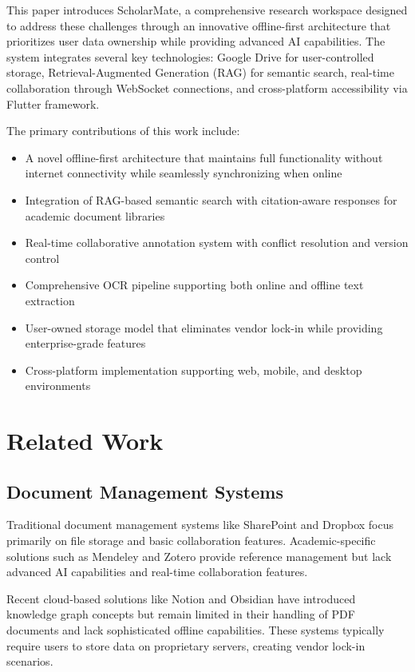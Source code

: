 \documentclass[conference]{IEEEtran}
\begin{document}
This paper introduces ScholarMate, a comprehensive research workspace designed to address these challenges through an innovative offline-first architecture that prioritizes user data ownership while providing advanced AI capabilities. The system integrates several key technologies: Google Drive for user-controlled storage, Retrieval-Augmented Generation (RAG) for semantic search, real-time collaboration through WebSocket connections, and cross-platform accessibility via Flutter framework.

The primary contributions of this work include:

\begin{itemize}
\item A novel offline-first architecture that maintains full functionality without internet connectivity while seamlessly synchronizing when online
\item Integration of RAG-based semantic search with citation-aware responses for academic document libraries
\item Real-time collaborative annotation system with conflict resolution and version control
\item Comprehensive OCR pipeline supporting both online and offline text extraction
\item User-owned storage model that eliminates vendor lock-in while providing enterprise-grade features
\item Cross-platform implementation supporting web, mobile, and desktop environments
\end{itemize}

\section{Related Work}

\subsection{Document Management Systems}

Traditional document management systems like SharePoint \cite{sharepoint} and Dropbox \cite{dropbox} focus primarily on file storage and basic collaboration features. Academic-specific solutions such as Mendeley \cite{mendeley} and Zotero \cite{zotero} provide reference management but lack advanced AI capabilities and real-time collaboration features.

Recent cloud-based solutions like Notion \cite{notion} and Obsidian \cite{obsidian} have introduced knowledge graph concepts but remain limited in their handling of PDF documents and lack sophisticated offline capabilities. These systems typically require users to store data on proprietary servers, creating vendor lock-in scenarios.
\end{document}
